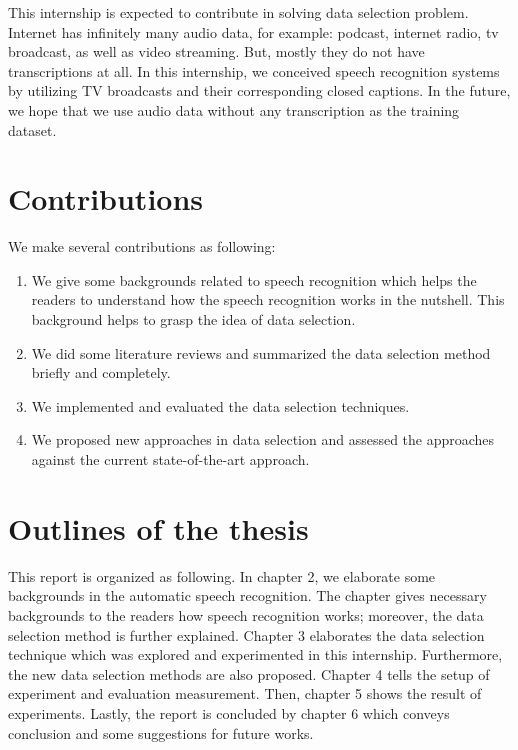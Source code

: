 
This internship is expected to contribute in solving data selection problem. Internet has infinitely many audio data, for example: podcast, internet radio, tv broadcast, as well as video streaming. But, mostly they do not have transcriptions at all. In this internship, we conceived speech recognition systems by utilizing TV broadcasts and their corresponding closed captions. In the future, we hope that we use audio data without any transcription as the training dataset.

\section{Contributions}
We make several contributions as following:
\begin{enumerate}
\item We give some backgrounds related to speech recognition which helps the readers to understand how the speech recognition works in the nutshell. This background helps to grasp the idea of data selection.
\item We did some literature reviews and summarized the data selection method briefly and completely.
\item  We implemented and evaluated the data selection techniques. 
\item We proposed new approaches in data selection and assessed the approaches against the current state-of-the-art approach. 
\end{enumerate}

\section{Outlines of the thesis}
This report is organized as following. In chapter 2, we elaborate some backgrounds in the automatic speech recognition. The chapter gives necessary backgrounds to the readers how speech recognition works; moreover, the  data selection method is further explained. Chapter 3 elaborates the data selection technique which was explored and experimented in this internship. Furthermore,  the new data selection methods are also proposed. Chapter 4 tells the setup of experiment and evaluation measurement. Then, chapter 5 shows the result of experiments. Lastly, the report is concluded by chapter 6 which conveys conclusion and some suggestions for future works. 
